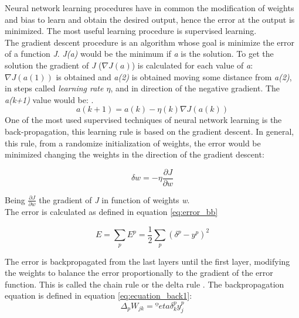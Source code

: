 Neural network learning procedures have in common the modification of weights and bias to learn and obtain the desired output, hence the error at the output is minimized. The most useful learning procedure is supervised learning.\\

The gradient descent procedure is an algorithm whose goal is minimize the error of a function \textit{J}. \textit{J(a)} would be the minimum if \textit{a} is the solution. To get the solution the gradient of \textit{J} ($\nabla J(a)$) is calculated for each value of \textit{a}: $\nabla J(a(1))$ is obtained and \textit{a(2)} is obtained moving some distance from \textit{a(2)}, in steps called \textit{learning rate $\eta$}, and in direction of the negative gradient. The \textit{a(k+1)} value would be: \cite{Duda}.\\

\begin{equation}
a(k+1) = a(k) - \eta (k) \nabla J(a(k))
\end{equation}
One of the most used supervised techniques of neural network learning is the back-propagation, this learning rule is based on the gradient descent. In general, this rule, from a randomize initialization of weights, the error would be minimized changing the weights in the direction of the gradient descent:

\begin{equation}
\delta w = -\eta\frac{\partial J}{\partial w}
\end{equation}

Being $\frac{\partial J}{\partial w}$ the gradient of \textit{J} in function of weights \textit{w}.\\

The error is calculated as defined in equation \ref{eq:error_bb}

\begin{equation}
E=\sum_{p}E^p = \frac{1}{2}\sum_{p}(\delta^p- y^p)^2
\end{equation} \label{eq:error_bb}

The error is backpropagated from the last layers until the first layer, modifying the weights to balance the error proportionally to the gradient of the error function. This is called the chain rule or the delta rule \cite{Duda, BINN, krose}. The backpropagation equation is defined in equation \ref{eq:ecuation_back1}:\\

			\begin{equation}
			\Delta_{p}W_{jk}=ºeta \delta _{k}^{p}y_{j}^{p}
			\label{eq:ecuation_back1}
			\end{equation}\\

